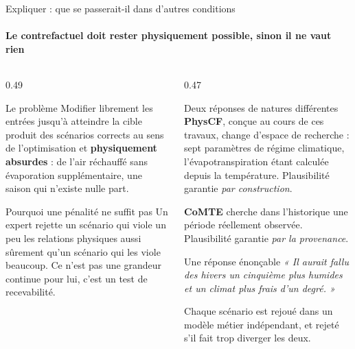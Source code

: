 \documentclass[aspectratio=169,11pt]{beamer}
\begin{document}
\begin{frame}{Expliquer : que se passerait-il dans d'autres conditions}
\framesubtitle{Le contrefactuel doit rester physiquement possible, sinon il ne vaut rien}
\vspace{-4pt}

\begin{columns}[T]
\begin{column}{0.49\textwidth}
\small
\begin{apport}{Le problème}
Modifier librement les entrées jusqu'à atteindre la cible produit des scénarios corrects au sens
de l'optimisation et \textbf{physiquement absurdes} : de l'air réchauffé sans évaporation
supplémentaire, une saison qui n'existe nulle part.
\end{apport}

\begin{apport}{Pourquoi une pénalité ne suffit pas}
Un expert rejette un scénario qui viole un peu les relations physiques aussi sûrement qu'un
scénario qui les viole beaucoup. Ce n'est pas une grandeur continue pour lui, c'est un test de
recevabilité.
\end{apport}
\end{column}

\begin{column}{0.47\textwidth}
\small
\begin{apport}{Deux réponses de natures différentes}
\textbf{PhysCF}, conçue au cours de ces travaux, change d'espace de recherche : sept paramètres
de régime climatique, l'évapotranspiration étant calculée depuis la température. Plausibilité
garantie \emph{par construction}.

\vspace{0.25em}
\textbf{CoMTE} cherche dans l'historique une période réellement observée. Plausibilité garantie
\emph{par la provenance}.
\end{apport}

\begin{apport}{Une réponse énonçable}
\emph{« Il aurait fallu des hivers un cinquième plus humides et un climat plus frais d'un
degré. »}
\end{apport}

\vspace{0.1em}
{\footnotesize\color{grisardoise} Chaque scénario est rejoué dans un modèle métier indépendant,
et rejeté s'il fait trop diverger les deux.\par}
\end{column}
\end{columns}
\end{frame}
\end{document}
